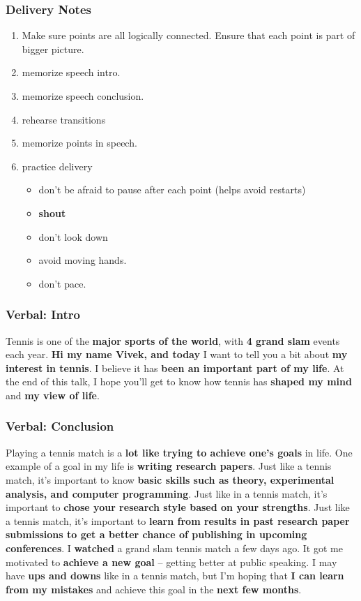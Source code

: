 \begin{frame}
\frametitle{Delivery Notes}
\begin{enumerate}
\item \small Make sure points are all logically connected.  Ensure that each point is part of bigger picture.
\item \small memorize speech intro.
\item \small memorize speech conclusion.
\item \small rehearse transitions
\item \small memorize points in speech.
\item \small practice delivery
\begin{itemize}
\item \tiny don't be afraid to pause after each point (helps avoid restarts)
\item \tiny \textbf{shout}
\item \tiny don't look down
\item \tiny avoid moving hands.
\item \tiny don't pace.
\end{itemize}
\end{enumerate}
\end{frame}


\begin{frame}
\frametitle{Verbal: Intro}
Tennis is one of the \textbf{major sports of the world}, with
\textbf{4 grand slam} events each year.  \textbf{Hi my name Vivek, and
  today} I want to tell you a bit about \textbf{my interest in
  tennis}. I believe it has \textbf{been an important part of my life}.
At the end of this talk, I hope you'll get to know how tennis has \textbf{shaped my mind}
and \textbf{my view of life}.

\end{frame}




\begin{frame}
\frametitle{Verbal: Conclusion}

Playing a tennis match  is a \textbf{lot like trying to achieve one's
  goals} in life. One example of a goal in my life is \textbf{writing
  research papers}. Just like a tennis match, it's important to know
\textbf{basic skills such as theory, experimental analysis, and
  computer programming}.  Just like in a tennis match, it's important
to \textbf{chose your research style based on your strengths}. Just
like a tennis match, it's important to \textbf{learn from results in
  past research paper submissions to get a better chance of publishing
  in upcoming conferences}.  I \textbf{watched} a grand slam tennis
match a few days ago. It got me motivated to \textbf{achieve a new
  goal} -- getting better at public speaking. I may have \textbf{ups
  and downs} like in a tennis match, but I'm hoping that \textbf{I can
  learn from my mistakes} and achieve this goal in the \textbf{next
  few months}.


\end{frame}
